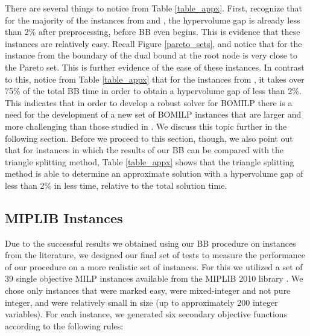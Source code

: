 \documentclass[11.5pt]{article}
\begin{document}
There are several things to notice from Table \ref{table_appx}. First, recognize that for the majority of the instances from \citet{boland2013criterion} and \citet{boland2015acriterion}, the hypervolume gap is already less than 2\% after preprocessing, before BB even begins. This is evidence that these instances are relatively easy. Recall Figure \ref{pareto_sets}, and notice that for the instance from \citet{boland2015acriterion} the boundary of the dual bound at the root node is very close to the Pareto set. This is further evidence of the ease of these instances. In contrast to this, notice from Table \ref{table_appx} that for the instances from \citep{belotti2012biobjective}, it takes over 75\% of the total BB time in order to obtain a hypervolume gap of less than 2\%. This indicates that in order to develop a robust solver for BOMILP there is a need for the development of a new set of BOMILP instances that are larger and more challenging than those studied in \citet{boland2015acriterion}. We discuss this topic further in the following section. Before we proceed to this section, though, we also point out that for instances in which the results of our BB can be compared with the triangle splitting method, Table \ref{table_appx} shows that the triangle splitting method is able to determine an approximate solution with a hypervolume gap of less than 2\% in less time, relative to the total solution time. 

\subsection{MIPLIB Instances}\label{sec:MIPLIB}

Due to the successful results we obtained using our BB procedure on instances from the literature, we designed our final set of tests to measure the performance of our procedure on a more realistic set of instances. For this we utilized a set of 39 single objective MILP instances available from the MIPLIB 2010 library \citep{koch2011miplib}. We chose only instances that were marked easy, were mixed-integer and not pure integer, and were relatively small in size (up to approximately 200 integer variables). For each instance, we generated six secondary objective functions according to the following rules:
\end{document}
